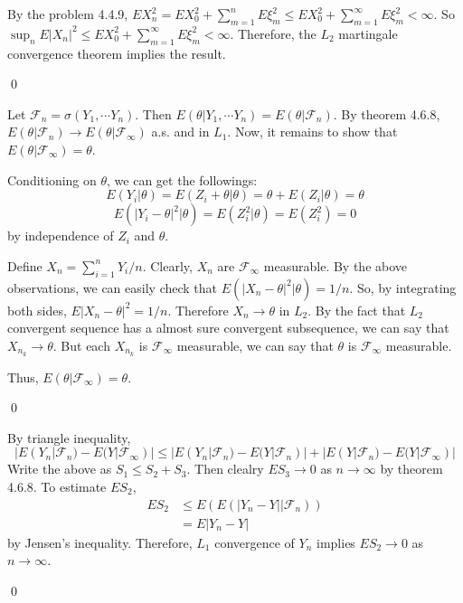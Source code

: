 \begin{problem}[4.4.10] \hfill
	
	By the problem 4.4.9, $EX_n^2 = EX_0^2 + \sum_{m=1}^n E\xi_m^2 \leq EX_0^2 +\sum_{m=1}^\infty E\xi_m^2 < \infty$.
	So $\sup_n E|X_n|^2 \leq EX_0^2 + \sum_{m=1}^\infty E\xi_m^2 < \infty$.
	Therefore, the $L_2$ martingale convergence theorem implies the result.

	\qed

\end{problem}

\begin{problem}[4.6.1] \hfill

	Let $\mathcal{F}_n = \sigma\left( Y_1, \cdots Y_n \right)$.
	Then $E(\theta | Y_1, \cdots Y_n) = E(\theta | \mathcal{F}_n)$.
	By theorem 4.6.8, $E(\theta | \mathcal{F}_n) \rightarrow E(\theta | \mathcal{F}_\infty)$ a.s. and in $L_1$.
	Now, it remains to show that $E(\theta |\mathcal{F}_\infty) = \theta$.

	Conditioning on $\theta$, we can get the followings:
	\[
		E(Y_i |\theta) = E(Z_i + \theta | \theta) = \theta + E(Z_i | \theta) = \theta
	\]
	\[
		E( |Y_i - \theta|^2 |\theta) = E(Z_i^2 |\theta) = E(Z_i^2) = 0
	\]
	by independence of $Z_i$ and $\theta$.

	Define $X_n = \sum_{i=1}^n Y_i /n$. Clearly, $X_n$ are $\mathcal{F}_\infty$ measurable.
	By the above observations, we can easily check that $E(|X_n - \theta|^2 | \theta) = 1/n$.
	So, by integrating both sides, $E|X_n - \theta|^2 = 1/n$.
	Therefore $X_n \rightarrow \theta$ in $L_2$.
	By the fact that $L_2$ convergent sequence has a almost sure convergent subsequence,
	we can say that $X_{n_k} \rightarrow \theta$.
	But each $X_{n_k}$ is $\mathcal{F}_\infty$ measurable, we can say that $\theta$ is $\mathcal{F}_\infty$ measurable.

	Thus, $E(\theta | \mathcal{F}_\infty) = \theta$.

	\qed
\end{problem}

\begin{problem}[4.6.7] \hfill

	By triangle inequality,
\[
	| E(Y_n | \mathcal{F}_n ) - E(Y |\mathcal{F}_\infty) |
	\leq |E(Y_n | \mathcal{F}_n ) - E(Y | \mathcal{F}_n) | + | E(Y | \mathcal{F}_n) - E(Y|\mathcal{F}_\infty) |
\]
Write the above as $S_1 \leq S_2 + S_3$.
Then clealry $E S_3 \rightarrow 0$ as $n \rightarrow \infty$ by theorem 4.6.8.
To estimate $E S_2$,
\[
	\begin{split}
		ES_2
		& \leq E \left( E\left(  |Y_n - Y| | \mathcal{F}_n \right) \right) \\
		& = E|Y_n -Y|
	\end{split}
\]
by Jensen's inequality.
Therefore, $L_1$ convergence of $Y_n$ implies $ES_2 \rightarrow 0$ as $n\rightarrow \infty$.

\qed

	
\end{problem}
